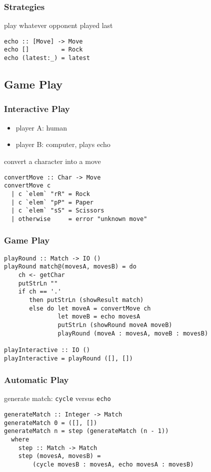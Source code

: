 \documentclass[dvipsnames]{beamer}
\theoremstyle{plain}
\begin{document}
\begin{frame}[fragile]
  \frametitle{Strategies}

  \begin{exampleblock}{play whatever opponent played last}
    \begin{lstlisting}
echo :: [Move] -> Move
echo []         = Rock
echo (latest:_) = latest
    \end{lstlisting}
  \end{exampleblock}
\end{frame}

\subsection{Game Play}

\begin{frame}[fragile]
  \frametitle{Interactive Play}

  \begin{itemize}
    \item player A: human
    \item player B: computer, plays echo
  \end{itemize}

  \begin{exampleblock}{convert a character into a move}
    \begin{lstlisting}
convertMove :: Char -> Move
convertMove c
  | c `elem` "rR" = Rock
  | c `elem` "pP" = Paper
  | c `elem` "sS" = Scissors
  | otherwise     = error "unknown move"
    \end{lstlisting}
  \end{exampleblock}
\end{frame}

\begin{frame}[fragile]
  \frametitle{Game Play}

  \begin{lstlisting}
playRound :: Match -> IO ()
playRound match@(movesA, movesB) = do
    ch <- getChar
    putStrLn ""
    if ch == '.'
       then putStrLn (showResult match)
       else do let moveA = convertMove ch
               let moveB = echo movesA
               putStrLn (showRound moveA moveB)
               playRound (moveA : movesA, moveB : movesB)

playInteractive :: IO ()
playInteractive = playRound ([], [])
  \end{lstlisting}
\end{frame}

\begin{frame}[fragile]
  \frametitle{Automatic Play}

  \begin{exampleblock}{generate match:
      \lstinline[deletekeywords={cycle}]|cycle| versus \lstinline|echo|}
    \begin{lstlisting}[deletekeywords={cycle}]
generateMatch :: Integer -> Match
generateMatch 0 = ([], [])
generateMatch n = step (generateMatch (n - 1))
  where
    step :: Match -> Match
    step (movesA, movesB) =
        (cycle movesB : movesA, echo movesA : movesB)
    \end{lstlisting}
  \end{exampleblock}
\end{frame}
\end{document}

